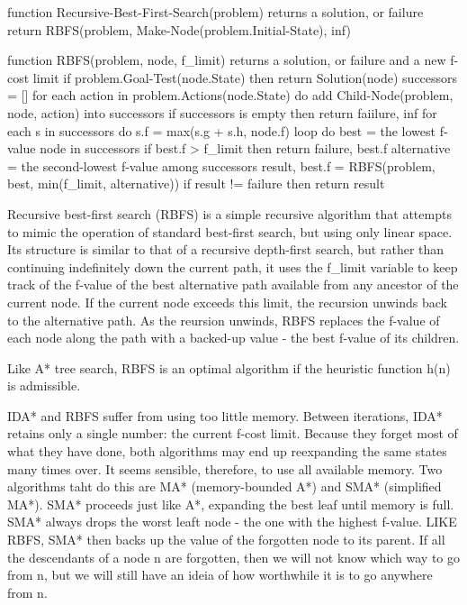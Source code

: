 \documentclass{article}
\begin{document}
\begin{lslisting}[caption = Recursive best-first search.]
    function Recursive-Best-First-Search(problem) returns a solution, or failure
        return RBFS(problem, Make-Node(problem.Initial-State), inf)

    function RBFS(problem, node, f_limit) returns a solution, or failure and a new f-cost limit
        if problem.Goal-Test(node.State) then return Solution(node)
        successors = []
        for each action in problem.Actions(node.State) do 
            add Child-Node(problem, node, action) into successors 
        if successors is empty then return faiilure, inf 
        for each s in successors do 
            s.f = max(s.g + s.h, node.f)
        loop do 
            best = the lowest f-value node in successors 
            if best.f > f_limit then return failure, best.f 
            alternative = the second-lowest f-value among successors 
            result, best.f = RBFS(problem, best, min(f_limit, alternative))
            if result != failure then return result
\end{lslisting}

Recursive best-first search (RBFS) is a simple recursive algorithm that attempts to mimic the operation of standard best-first search, but using only linear space. Its structure is similar to that of a recursive depth-first search, but rather than continuing indefinitely down the current path, it uses the f_limit variable to keep track of the f-value of the best alternative path available from any ancestor of the current node. If the current node exceeds this limit, the recursion unwinds back to the alternative path. As the reursion unwinds, RBFS replaces the f-value of each node along the path with a backed-up value - the best f-value of its children. 

Like A* tree search, RBFS is an optimal algorithm if the heuristic function h(n) is admissible. 

IDA* and RBFS suffer from using too little memory. Between iterations, IDA* retains only a single number: the current f-cost limit. Because they forget most of what they have done, both algorithms may end up reexpanding the same states many times over. It seems sensible, therefore, to use all available memory. Two algorithms taht do this are MA* (memory-bounded A*) and SMA* (simplified MA*). SMA* proceeds just like A*, expanding the best leaf until memory is full. SMA* always drops the worst leaft node - the one with the highest f-value. LIKE RBFS, SMA* then backs up the value of the forgotten node to its parent. If all the descendants of a node n are forgotten, then we will not know which way to go from n, but we will still have an ideia of how worthwhile it is to go anywhere from n.
\end{document}
